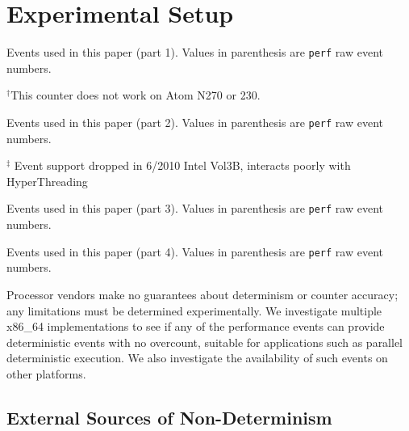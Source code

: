 \section{Experimental Setup}

\begin{tiny}
\begin{table*}[!htpb]
\caption{Events used in this paper (part 1).  
         Values in parenthesis are {\tt perf} raw event numbers.}
\label{table:events1}
\centering
\scriptsize

\hspace{0.2in}$^{\dagger}$This counter does not work on Atom N270 or 230.
\end{table*}
\end{tiny}

\begin{table*}[!htpb]
\caption{Events used in this paper (part 2).  
         Values in parenthesis are {\tt perf} raw event numbers.}
\label{table:events2}
\centering
\scriptsize

\hspace{0.2in}$^{\ddagger}$ Event support dropped in 6/2010
Intel Vol3B, interacts poorly with HyperThreading
\end{table*}

\begin{table*}[!htpb]
\caption{Events used in this paper (part 3).  
         Values in parenthesis are {\tt perf} raw event numbers.}
\label{table:events3}
\centering
\scriptsize

\end{table*}

\begin{table*}[!htpb]
\caption{Events used in this paper (part 4).  
         Values in parenthesis are {\tt perf} raw event numbers.}
\label{table:events4}
\centering
\scriptsize

\end{table*}


Processor vendors make no guarantees about determinism or
counter accuracy; any limitations must be determined
experimentally.  
We investigate 
multiple x86\_64 
implementations to see if any of the performance events can
provide deterministic events with no overcount, suitable for
applications such as
parallel deterministic execution.  
We also investigate the availability of such events on
other platforms.

\subsection{External Sources of Non-Determinism}

